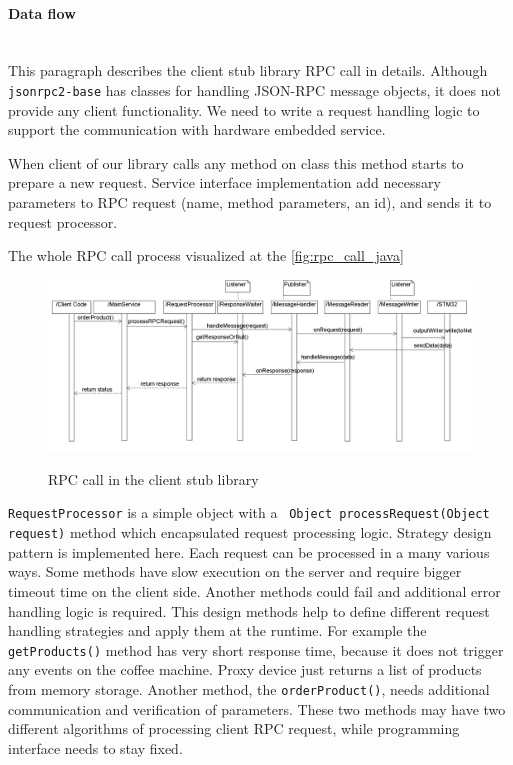 \paragraph{Data flow} ~\\

This paragraph describes the client stub library RPC call in details. 
Although \texttt{jsonrpc2-base} has classes for handling JSON-RPC message
objects, it does not provide any client functionality. 
We need to write a request handling logic to support the communication with
hardware embedded service.

When client of our library calls any method on 
class this method starts to prepare a new request. Service interface
implementation add necessary parameters to RPC request (name, method
parameters, an id), and sends it to request processor.

The whole RPC call process visualized at the \autoref{fig:rpc_call_java} 


\begin{figure}
\centering
\scalebox{0.4}
{\includegraphics{../images/implementation/java_flow_diagram.png}}
\caption{RPC call in the client stub library}
\label{fig:rpc_call_java}
\end{figure}

\texttt{RequestProcessor} is a simple object with a ~\texttt{Object
processRequest(Object request)} method which encapsulated request processing
logic. Strategy design pattern is implemented here. 
Each request can be processed in a many various ways.
Some methods  have slow execution  on the server and require bigger timeout time
on the client side. Another methods could fail and additional error handling
logic is required. This design methods help to define different  
request handling strategies and apply them at the runtime.
For example the \texttt{getProducts()}  method has very short response time,
because it does not trigger any events on the coffee machine.
Proxy device just returns a list of products from memory storage. 
Another method, the \texttt{orderProduct()}, needs additional communication and
verification of parameters. 
These two methods may have two different algorithms of processing client RPC
request, while programming interface needs to stay fixed.

